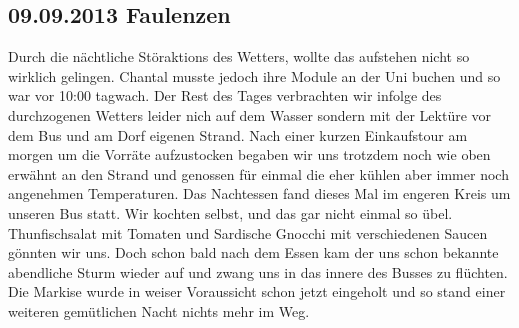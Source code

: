 \subsection{09.09.2013 Faulenzen} 
Durch die nächtliche Störaktions des Wetters, wollte das aufstehen nicht so wirklich gelingen.
Chantal musste jedoch ihre Module an der Uni buchen und so war vor 10:00 tagwach.
Der Rest des Tages verbrachten wir infolge des durchzogenen Wetters leider nich auf dem Wasser sondern mit der Lektüre vor dem Bus und am Dorf eigenen Strand.
Nach einer kurzen Einkaufstour am morgen um die Vorräte aufzustocken begaben wir uns trotzdem noch wie oben erwähnt an den Strand und genossen für einmal die eher kühlen aber immer noch angenehmen Temperaturen.
Das Nachtessen fand dieses Mal im engeren Kreis um unseren Bus statt.
Wir kochten selbst, und das gar nicht einmal so übel.
Thunfischsalat mit Tomaten und Sardische Gnocchi mit verschiedenen Saucen gönnten wir uns.
Doch schon bald nach dem Essen kam der uns schon bekannte abendliche Sturm wieder auf und zwang uns in das innere des Busses zu flüchten.
Die Markise wurde in weiser Voraussicht schon jetzt eingeholt und so stand einer weiteren gemütlichen Nacht nichts mehr im Weg.


